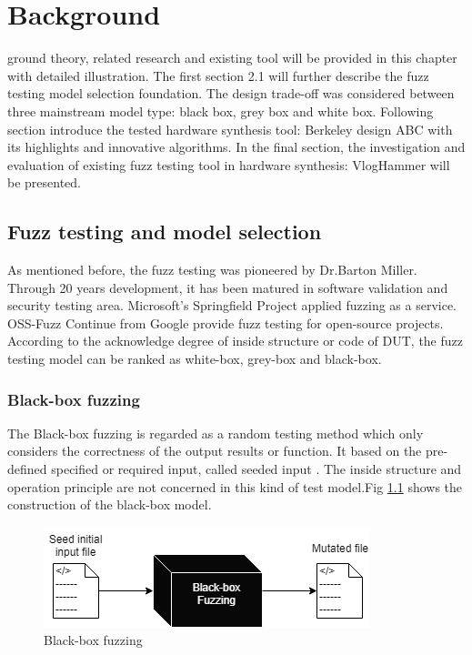\chapter{Background}
\renewcommand{\baselinestretch}{\mystretch}
\label{chap:Back}
 ground theory, related research and existing tool will be provided in this chapter with detailed illustration. The first section 2.1 will further describe the fuzz testing model selection foundation. The design trade-off was considered between three mainstream model type: black box, grey box and white box. Following section introduce the tested hardware synthesis tool: Berkeley design ABC with its highlights and innovative algorithms. In the final section, the investigation and evaluation of existing fuzz testing tool in hardware synthesis: VlogHammer will be presented.
\section{Fuzz testing and model selection}
As mentioned before, the fuzz testing was pioneered by Dr.Barton Miller. Through 20 years development, it has been matured in software validation and security testing area. Microsoft's Springfield Project applied fuzzing as a service. OSS-Fuzz Continue from Google provide fuzz testing for open-source projects. According to the acknowledge degree of inside structure or code of DUT, the fuzz testing model can be ranked as white-box, grey-box and black-box.
\subsection{Black-box fuzzing}
The Black-box fuzzing is regarded as a random testing method which only considers the correctness of the output results or function. It based on the pre-defined specified or required input, called seeded input \cite{nidhra2012black}. The inside structure and operation principle are not concerned in this kind of test model.Fig \ref{fig:balckbox} shows the construction of the black-box model. 
\begin{figure}[htbp]
    \centering
    \includegraphics[scale=0.8]{MScThesisTemplate/Figs/balckbox.png}
    \caption{Black-box fuzzing}
    \label{fig:balckbox}
\end{figure}

